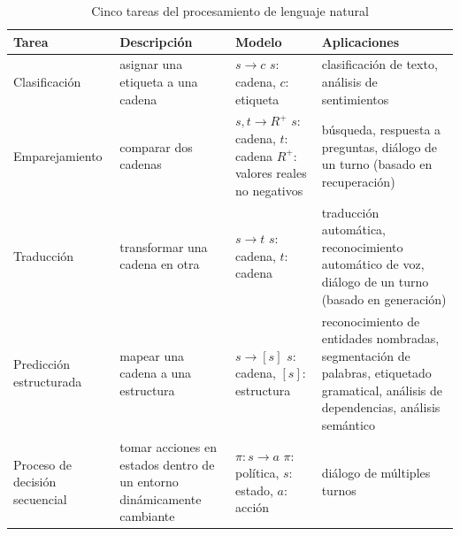 \begin{table}[H]
\centering
\caption{Cinco tareas del procesamiento de lenguaje natural \cite{Li2018}}
\label{tab:five-nlp-tasks}
\renewcommand{\arraystretch}{1.4}
\setlength{\tabcolsep}{8pt}
\small
\begin{tabular}{@{} >{\raggedright\arraybackslash}p{2.6cm}
                    >{\raggedright\arraybackslash}p{3.2cm}
                    >{\raggedright\arraybackslash}p{2.6cm}
                    >{\raggedright\arraybackslash}p{4.2cm} @{}}
\toprule
\textbf{Tarea} & \textbf{Descripción} & \textbf{Modelo} & \textbf{Aplicaciones} \\
\midrule

Clasificación &
asignar una etiqueta a una cadena &
$s \rightarrow c$ \newline
$s$: cadena, $c$: etiqueta &
clasificación de texto, análisis de sentimientos \\

\midrule

Emparejamiento &
comparar dos cadenas &
$s, t \rightarrow R^{+}$ \newline
$s$: cadena, $t$: cadena \newline
$R^{+}$: valores reales no negativos &
búsqueda, respuesta a preguntas, diálogo de un turno (basado en recuperación) \\

\midrule

Traducción &
transformar una cadena en otra &
$s \rightarrow t$ \newline
$s$: cadena, $t$: cadena &
traducción automática, reconocimiento automático de voz, diálogo de un turno (basado en generación) \\

\midrule

Predicción estructurada &
mapear una cadena a una estructura &
$s \rightarrow [s]$ \newline
$s$: cadena, $[s]$: estructura &
reconocimiento de entidades nombradas, segmentación de palabras, etiquetado gramatical, análisis de dependencias, análisis semántico \\

\midrule

Proceso de decisión secuencial &
tomar acciones en estados dentro de un entorno dinámicamente cambiante &
$\pi: s \rightarrow a$ \newline
$\pi$: política, $s$: estado, $a$: acción &
diálogo de múltiples turnos \\

\bottomrule
\end{tabular}
\end{table}


